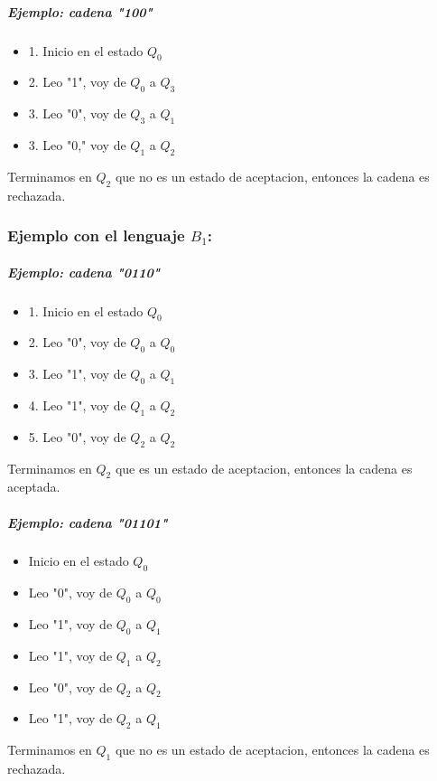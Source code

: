 \documentclass[a4paper, 12pt]{article}
\begin{document}
\space
\subparagraph{Ejemplo: cadena "100"}
\begin{itemize}
    \item 1. Inicio en el estado \( Q_0 \)
    \item 2. Leo "1", voy de \( Q_0 \) a \( Q_3 \)
    \item 3. Leo "0", voy de \( Q_3 \) a \( Q_1 \)
    \item 3. Leo "0," voy de \( Q_1 \) a \( Q_2 \)
\end{itemize}
    Terminamos en \( Q_2 \) que no es un estado de aceptacion, entonces la cadena es rechazada.



\subsubsection*{Ejemplo con el lenguaje \( B_1 \):}

\subparagraph{Ejemplo: cadena "0110"}
\begin{itemize}
    \item 1. Inicio en el estado \( Q_0 \)
    \item 2. Leo "0", voy de \( Q_0 \) a \( Q_0 \)
    \item 3. Leo "1", voy de \( Q_0 \) a \( Q_1 \)
    \item 4. Leo "1", voy de \( Q_1 \) a \( Q_2 \)
    \item 5. Leo "0", voy de \( Q_2 \) a \( Q_2 \)
\end{itemize}

\space
    Terminamos en \( Q_2 \) que es un estado de aceptacion, entonces la cadena es aceptada.

\subparagraph{Ejemplo: cadena "01101"}
\begin{itemize}
    \item  Inicio en el estado \( Q_0 \)
    \item  Leo "0", voy de \( Q_0 \) a \( Q_0 \)
    \item  Leo "1", voy de \( Q_0 \) a \( Q_1 \)
    \item  Leo "1", voy de \( Q_1 \) a \( Q_2 \)
    \item  Leo "0", voy de \( Q_2 \) a \( Q_2 \)
    \item  Leo "1", voy de \( Q_2 \) a \( Q_1 \)
\end{itemize}

\space
    Terminamos en \( Q_1 \) que no es un estado de aceptacion, entonces la cadena es rechazada.
\end{document}
